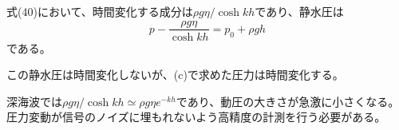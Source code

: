\documentclass[a4paper]{jsarticle}
\begin{document}
\subsubsection{}
式(40)において、時間変化する成分は$\rho g \eta / \cosh k h$であり、静水圧は
\begin{equation}
  p - \frac{\rho g \eta}{\cosh k h} = p_0 + \rho g h
\end{equation}
である。\par
この静水圧は時間変化しないが、(c)で求めた圧力は時間変化する。\par
深海波では$\rho g \eta / \cosh k h \simeq \rho g \eta e^{-k h}$であり、動圧の大きさが急激に小さくなる。
圧力変動が信号のノイズに埋もれないよう高精度の計測を行う必要がある。
\end{document}
